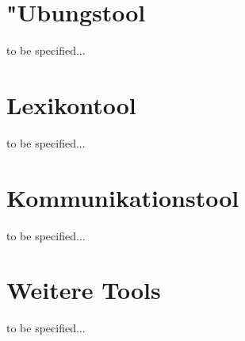\documentclass[11pt,makeidx,fleqn]{article}
\begin{document}

\newenvironment{list_sabina}{\begin{list}{$\bullet$}{\setlength{\labelwidth}{3mm} \setlength{\labelsep}{2mm} \setlength{\parsep}{1mm} \setlength{\topsep}{0mm} \setlength{\itemsep}{0mm}}}{\end{list}}
 
\newenvironment{sub_list_sabina}{\begin{list}{$\circ$}{\setlength{\labelwidth}{2.5mm} \setlength{\labelsep}{1mm} \setlength{\parsep}{1mm} \setlength{\topsep}{0mm} \setlength{\itemsep}{-1mm}}}{\end{list}}             



\clearpage

\tableofcontents
\clearpage



\clearpage



\clearpage



\clearpage

\section{"Ubungstool}\label{lerntool}
to be specified...

\section{Lexikontool}\label{lerntool}
to be specified...

\section{Kommunikationstool}\label{lerntool}
to be specified...

\section{Weitere Tools}\label{weitere_tools}
to be specified...








\end{document}
